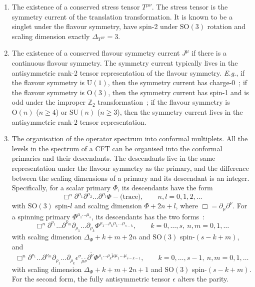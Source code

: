 \documentclass{timesjhep}
\begin{document}
\begin{enumerate}
    \item The existence of a conserved stress tensor $T^{\mu\nu}$. The stress tensor is the symmetry current of the translation transformation. It is known to be a singlet under the flavour symmetry, have spin-2 under $\mathrm{SO}(3)$ rotation and scaling dimension exactly $\Delta_{T^{\mu\nu}}=3$. 
    \item The existence of a conserved flavour symmetry current $J^\mu$ if there is a continuous flavour symmetry. The symmetry current typically lives in the antisymmetric rank-2 tensor representation of the flavour symmetry. \textit{E.g.}, if the flavour symmetry is $\mathrm{U}(1)$, then the symmetry current has charge-0~; if the flavour symmetry is $\mathrm{O}(3)$, then the symmetry current has spin-1 and is odd under the improper $\mathbb{Z}_2$ transformation~; if the flavour symmetry is $\mathrm{O}(n)$ ($n\ge 4$) or $\mathrm{SU}(n)$ ($n\ge 3$), then the symmetry current lives in the antisymmetric rank-$2$ tensor representation. 
    \item The organisation of the operator spectrum into conformal multiplets. All the levels in the spectrum of a CFT can be organised into the conformal primaries and their descendants. The descendants live in the same representation under the flavour symmetry as the primary, and the difference between the scaling dimensions of a primary and its descendant is an integer. Specifically, for a scalar primary $\Phi$, its descendants have the form 
    \begin{equation*}
        \Box^n\partial^{\mu_1}\partial^{\mu_2}\dots\partial^{\mu_l}\Phi-\textrm{(trace)},\qquad n,l=0,1,2,\dots
    \end{equation*}
    with $\mathrm{SO}(3)$ spin-$l$ and scaling dimension $\Phi+2n+l$, where $\Box=\partial_\mu\partial^\nu$. For a spinning primary $\Phi^{\mu_1\dots\mu_s}$, its descendants has the two forms~: 
    \begin{equation*}
        \Box^n\partial^{\nu_1}\dots\partial^{\nu_m}\partial_{\rho_1}\dots\partial_{\rho_k}\Phi^{\rho_1\dots\rho_{k}\mu_1\dots \mu_{s-k}},\qquad k=0,\dots,s,\ n,m=0,1,\dots
    \end{equation*}
    with scaling dimension $\Delta_\Phi+k+m+2n$ and $\mathrm{SO}(3)$ spin-$(s-k+m)$, and 
    \begin{equation*}
        \Box^n\partial^{\nu_1}\dots\partial^{\nu_m}\partial_{\rho_1}\dots\partial_{\rho_k}\epsilon^{\sigma}{}_{\tilde{\mu}\tilde{\nu}}\partial^{\tilde{\nu}}\Phi^{\rho_1\dots\rho_{k}\tilde{\mu}\mu_1\dots \mu_{s-k-1}},\qquad k=0,\dots,s-1,\ n,m=0,1,\dots
    \end{equation*}
    with scaling dimension $\Delta_\Phi+k+m+2n+1$ and $\mathrm{SO}(3)$ spin-$(s-k+m)$. For the second form, the fully antisymmetric tensor $\epsilon$ alters the parity. 
\end{enumerate} 
\end{document}
